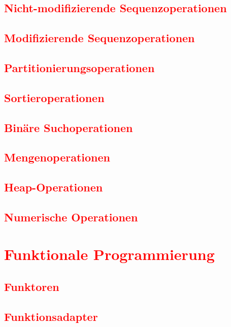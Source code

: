 \subsection{\textcolor{red}{Nicht-modifizierende Sequenzoperationen}}\label{sec:non-modifying-sequence-operations}
\subsection{\textcolor{red}{Modifizierende Sequenzoperationen}}\label{sec:modifying-sequence-operations}
\subsection{\textcolor{red}{Partitionierungsoperationen}}\label{sec:partitioning-operations}
\subsection{\textcolor{red}{Sortieroperationen}}\label{sec:sorting-operations}
\subsection{\textcolor{red}{Binäre Suchoperationen}}\label{sec:binary-search-operations}
\subsection{\textcolor{red}{Mengenoperationen}}\label{sec:set-operations}
\subsection{\textcolor{red}{Heap-Operationen}}\label{sec:heap-operations}
\subsection{\textcolor{red}{Numerische Operationen}}\label{sec:numeric-operations}
\section{\textcolor{red}{Funktionale Programmierung}}\label{sec:functional-programming}
\subsection{\textcolor{red}{Funktoren}}\label{sec:functors}
\subsection{\textcolor{red}{Funktionsadapter}}\label{sec:function-adapters}
